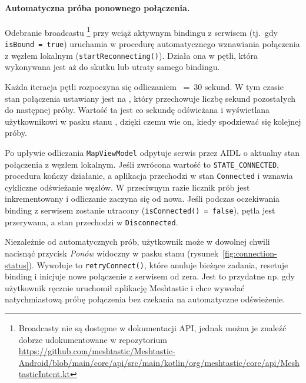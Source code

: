 \paragraph{Automatyczna próba ponownego połączenia.}

Odebranie broadcastu \texttt{} \footnote{Broadcasty nie są dostępne w dokumentacji API, jednak można je znaleźć dobrze udokumentowane w repozytorium \url{https://github.com/meshtastic/Meshtastic-Android/blob/main/core/api/src/main/kotlin/org/meshtastic/core/api/MeshtasticIntent.kt}} przy wciąż aktywnym bindingu
z serwisem (tj.\ gdy \texttt{isBound~=~true}) uruchamia w \texttt{} procedurę
automatycznego wznawiania połączenia z węzłem lokalnym (\texttt{startReconnecting()}). Działa ona
w pętli, która wykonywana jest aż do skutku lub utraty samego bindingu.

Każda iteracja pętli rozpoczyna się odliczaniem \texttt{}~=~30
sekund. W tym czasie stan połączenia ustawiany jest na \texttt{},
który przechowuje liczbę sekund pozostałych do następnej próby. Wartość ta jest co sekundę
odświeżana i wyświetlana użytkownikowi w pasku stanu \texttt{}, dzięki czemu
wie on, kiedy spodziewać się kolejnej próby.

Po upływie odliczania \texttt{MapViewModel} odpytuje serwis przez AIDL o aktualny stan połączenia z węzłem lokalnym.
Jeśli zwrócona wartość to \texttt{STATE\_CONNECTED}, procedura kończy działanie, a aplikacja
przechodzi w stan \texttt{Connected} i wznawia cykliczne odświeżanie węzłów. W przeciwnym razie
licznik prób jest inkrementowany i odliczanie zaczyna się od nowa. Jeśli podczas oczekiwania
binding z serwisem zostanie utracony (\texttt{isConnected()~=~false}), pętla jest przerywana,
a stan przechodzi w \texttt{Disconnected}.

Niezależnie od automatycznych prób, użytkownik może w dowolnej chwili nacisnąć przycisk
\textit{Ponów} widoczny w pasku stanu (rysunek~\ref{fig:connection-status}). Wywołuje to \texttt{retryConnect()},
które anuluje bieżące zadania, resetuje binding i inicjuje nowe połączenie z serwisem
od zera. Jest to przydatne np. gdy użytkownik ręcznie uruchomił aplikację Meshtastic i chce wywołać
natychmiastową próbę połączenia bez czekania na automatyczne odświeżenie.

